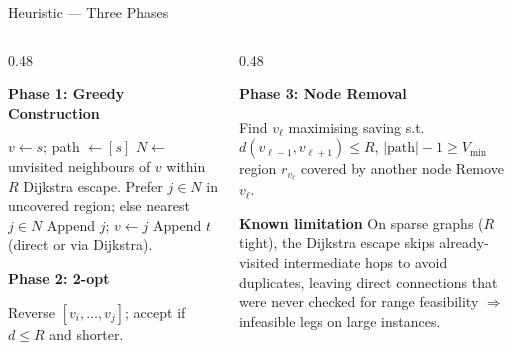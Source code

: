 \documentclass{beamer}
\begin{document}
\begin{frame}{Heuristic --- Three Phases}

\begin{columns}[T]
\begin{column}{0.48\textwidth}
\begin{block}{\textbf{Phase 1: Greedy Construction}}
\footnotesize
\begin{algorithmic}[1]
\State $v\leftarrow s$; path $\leftarrow [s]$
  \State $N\leftarrow$ unvisited neighbours of $v$ within $R$
   \State Dijkstra escape. \EndIf
  \State Prefer $j\in N$ in uncovered region; else nearest $j\in N$
  \State Append $j$; $v\leftarrow j$
\EndWhile
\State Append $t$ (direct or via Dijkstra).
\end{algorithmic}
\end{block}

\vspace{3pt}

\begin{block}{\textbf{Phase 2: 2-opt}}
\footnotesize
\begin{algorithmic}[1]
\Repeat
    \State Reverse $[v_i,\ldots,v_j]$; accept if $d\leq R$ and shorter.
  \EndFor
{}
\end{algorithmic}
\end{block}
\end{column}

\begin{column}{0.48\textwidth}
\begin{block}{\textbf{Phase 3: Node Removal}}
\footnotesize
\begin{algorithmic}[1]
\Repeat
  \State Find $v_\ell$ maximising saving s.t.
  \State \hspace{1em} $d(v_{\ell-1},v_{\ell+1})\leq R$,\; $|\text{path}|-1\geq V_{\min}$
  \State \hspace{1em} region $r_{v_\ell}$ covered by another node
   \State Remove $v_\ell$. \EndIf
{}
\end{algorithmic}
\end{block}

\vspace{4pt}

\begin{block}{\textbf{Known limitation}}
\small
On sparse graphs ($R$ tight), the Dijkstra escape skips already-visited intermediate hops to avoid duplicates, leaving direct connections that were never checked for range feasibility $\Rightarrow$ infeasible legs on large instances.
\end{block}
\end{column}
\end{columns}

\end{frame}
\end{document}
